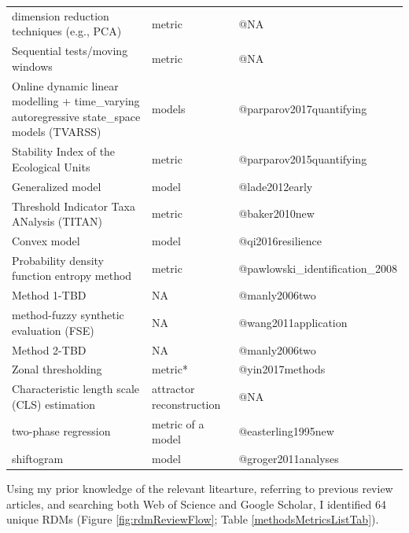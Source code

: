 \documentclass[12pt,twoside,openany]{reedthesis}
\newenvironment{Shaded}{\begin{snugshade}}{\end{snugshade}}
\newcommand{\KeywordTok}[1]{\textcolor[rgb]{0.13,0.29,0.53}{\textbf{#1}}}
\newcommand{\DataTypeTok}[1]{\textcolor[rgb]{0.13,0.29,0.53}{#1}}
\newcommand{\DecValTok}[1]{\textcolor[rgb]{0.00,0.00,0.81}{#1}}
\newcommand{\StringTok}[1]{\textcolor[rgb]{0.31,0.60,0.02}{#1}}
\newcommand{\OperatorTok}[1]{\textcolor[rgb]{0.81,0.36,0.00}{\textbf{#1}}}
\newcommand{\NormalTok}[1]{#1}
\begin{document}
\begin{longtable}{lll}
dimension reduction techniques (e.g., PCA) & metric & @NA\\
\addlinespace
Sequential tests/moving windows & metric & @NA\\
Online dynamic linear modelling +  time\_varying autoregressive state\_space models (TVARSS) & models & @parparov2017quantifying\\
Stability Index of the Ecological Units & metric & @parparov2015quantifying\\
Generalized model & model & @lade2012early\\
Threshold Indicator Taxa ANalysis (TITAN) & metric & @baker2010new\\
\addlinespace
Convex model & model & @qi2016resilience\\
Probability density function entropy method & metric & @pawlowski\_identification\_2008\\
Method 1-TBD & NA & @manly2006two\\
method-fuzzy synthetic evaluation (FSE) & NA & @wang2011application\\
Method 2-TBD & NA & @manly2006two\\
\addlinespace
Zonal thresholding & metric* & @yin2017methods\\
Characteristic length scale (CLS) estimation & attractor reconstruction & @NA\\
two-phase regression & metric of a model & @easterling1995new\\
shiftogram & model & @groger2011analyses\\*
\end{longtable}
Using my prior knowledge of the relevant litearture, referring to
previous review articles, and searching both Web of Science and Google
Scholar, I identified 64 unique RDMs (Figure \ref{fig:rdmReviewFlow};
Table \ref{methodsMetricsListTab}).
\begin{Shaded}
\end{Shaded}
\end{document}
